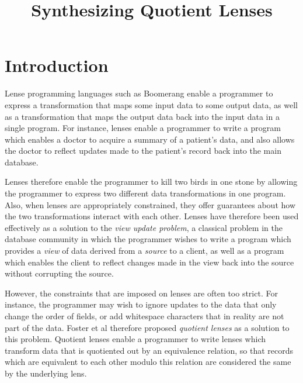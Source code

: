 \documentclass{svproc}
\begin{document}
\mainmatter              %
%
\title{Synthesizing Quotient Lenses}
%
%
\author{}
%
\authorrunning{} %
%
\tocauthor{}
%
\institute{}

\maketitle              %

\begin{abstract}

\end{abstract}

\section{Introduction}
Lense programming languages such as Boomerang enable a programmer to express a
transformation that maps some input data to some output data, as well as a
transformation that maps the output data back into the input data in a single
program. For instance, lenses enable a programmer to write a program which
enables a doctor to acquire a summary of a patient's data, and also allows the
doctor to reflect updates made to the patient's record back into the main
database.

Lenses therefore enable the  programmer to kill two birds in one
stone by allowing the programmer to express two different data transformations
in one program. Also, when lenses are appropriately constrained, they offer
guarantees about how the two transformations interact with each other. Lenses
have therefore been used effectively as a solution to the \textit{view update
problem}, a classical problem in the database community in which the
programmer wishes to write a program which provides a \textit{view} of data
derived from a \textit{source} to a client, as well as a program which enables
the client to reflect changes made in the view back into the source without
corrupting the source.

However, the constraints that are imposed on lenses are often too strict.
For instance, the programmer may wish to ignore updates to the data that only
change the order of fields, or add whitespace characters that in reality are not
part of the data. Foster et al therefore proposed \textit{quotient lenses} as a
solution to this problem. Quotient lenses enable a programmer to write lenses
which transform data that is quotiented out by an equivalence relation, so that
records which are equivalent to each other modulo this relation are considered
the same by the underlying lens.
\end{document}

